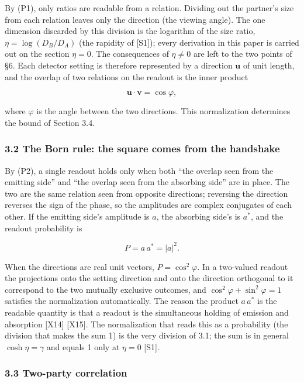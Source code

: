 \documentclass[
  a4paper,
]{article}
\begin{document}
By (P1), only ratios are readable from a relation. Dividing out the
partner's size from each relation leaves only the direction (the viewing
angle). The one dimension discarded by this division is the logarithm of
the size ratio, \(\eta=\log(D_B/D_A)\) (the rapidity of {[}S1{]}); every
derivation in this paper is carried out on the section \(\eta=0\). The
consequences of \(\eta\neq0\) are left to the two points of §6. Each
detector setting is therefore represented by a direction
\(\boldsymbol{u}\) of unit length, and the overlap of two relations on
the readout is the inner product

\[
\boldsymbol{u}\cdot\boldsymbol{v}=\cos\varphi,
\]

where \(\varphi\) is the angle between the two directions. This
normalization determines the bound of Section 3.4.

\subsubsection{3.2 The Born rule: the square comes from the
handshake}\label{the-born-rule-the-square-comes-from-the-handshake}

By (P2), a single readout holds only when both ``the overlap seen from
the emitting side'' and ``the overlap seen from the absorbing side'' are
in place. The two are the same relation seen from opposite directions;
reversing the direction reverses the sign of the phase, so the
amplitudes are complex conjugates of each other. If the emitting side's
amplitude is \(a\), the absorbing side's is \(a^{*}\), and the readout
probability is

\[
P=a\,a^{*}=|a|^{2}.
\]

When the directions are real unit vectors, \(P=\cos^{2}\varphi\). In a
two-valued readout the projections onto the setting direction and onto
the direction orthogonal to it correspond to the two mutually exclusive
outcomes, and \(\cos^{2}\varphi+\sin^{2}\varphi=1\) satisfies the
normalization automatically. The reason the product \(a\,a^{*}\) is the
readable quantity is that a readout is the simultaneous holding of
emission and absorption {[}X14{]} {[}X15{]}. The normalization that
reads this as a probability (the division that makes the sum 1) is the
very division of 3.1; the sum is in general \(\cosh\eta=\gamma\) and
equals 1 only at \(\eta=0\) {[}S1{]}.

\subsubsection{3.3 Two-party correlation}\label{two-party-correlation}
\end{document}
